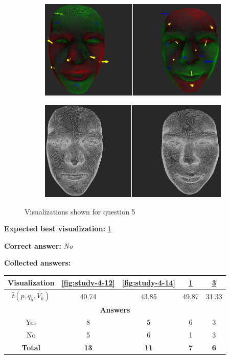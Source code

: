 \begin{figure}[h]
\begin{subfigure}{0.49\textwidth}
\includegraphics[width=\textwidth]{./screenshots/pair11.PNG}
\caption{}
\label{fig:study-4-11}
\end{subfigure}
\begin{subfigure}{0.49\textwidth}
\includegraphics[width=\textwidth]{./screenshots/pair13.PNG}
\caption{}
\label{fig:study-4-13}
\end{subfigure}
\caption{Visualizations shown for question 5}
\end{figure}
\medskip

{\bf Expected best visualization:} \ref{fig:study-4-11}
\medskip

{\bf Correct answer:} {\it No}
\medskip

{\bf Collected answers:}

\begin{center}
\begin{tabular}{| c | c | c | c | c |}
	\hline
	Visualization & \ref{fig:study-4-12} & \ref{fig:study-4-14} & \ref{fig:study-4-11} & \ref{fig:study-4-13}\\ \hline
	\(\widehat{t}(p, q_5, V_k)\) & 40.74 & 43.85 & 49.87 & 31.33\\ \hline
	\multicolumn{5}{|c|}{\bf Answers} \\ \hline
	Yes & 8 & 5 & 6 & 3\\ \hline
	\rowcolor{yellow!30} No & 5 & 6 & 1 & 3\\ \hline
	{\bf Total} & {\bf 13} & {\bf 11} & {\bf 7} & {\bf 6}\\ \hline
\end{tabular}
\end{center}
\clearpage

